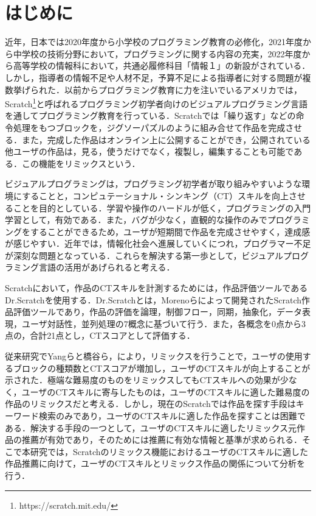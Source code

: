 \documentclass[11pt]{jreport}
\begin{document}
\newpage
{}	%



\chapter{はじめに}

近年，日本では2020年度から小学校のプログラミング教育の必修化，2021年度から中学校の技術分野において，プログラミングに関する内容の充実，2022年度から高等学校の情報科において，共通必履修科目「情報１」の新設がされている．\cite{monkashou}しかし，指導者の情報不足や人材不足，予算不足による指導者に対する問題が複数挙げられた．\cite{monkashou2}以前からプログラミング教育に力を注いでいるアメリカでは，Scratch\footnote{https://scratch.mit.edu/}\cite{resnick2009scratch}と呼ばれるプログラミング初学者向けのビジュアルプログラミング言語を通してプログラミング教育を行っている．Scratchでは「繰り返す」などの命令処理をもつブロックを，ジグソーパズルのように組み合せて作品を完成させる．また，完成した作品はオンライン上に公開することができ，公開されている他ユーザの作品は，見る，使うだけでなく，複製し，編集することも可能である．この機能をリミックスという．

ビジュアルプログラミングは，プログラミング初学者が取り組みやすいような環境にすることと，コンピュテーショナル・シンキング（CT）\cite{wing2006computational}スキルを向上させることを目的としている．学習や操作のハードルが低く，プログラミングの入門学習として，有効である．また，バグが少なく，直観的な操作のみでプログラミングをすることができるため，ユーザが短期間で作品を完成させやすく，達成感が感じやすい．近年では，情報化社会へ進展していくにつれ，プログラマー不足が深刻な問題となっている．これらを解決する第一歩として，ビジュアルプログラミング言語の活用があげられると考える．

Scratchにおいて，作品のCTスキルを計測するためには，作品評価ツールであるDr.Scratch\cite{moreno2015dr}を使用する．Dr.Scratchとは，Morenoらによって開発されたScratch作品評価ツールであり，作品の評価を論理，制御フロー，同期，抽象化，データ表現，ユーザ対話性，並列処理の7概念に基づいて行う．また，各概念を0点から3点の，合計21点とし，CTスコアとして評価する．

従来研究でYangら\cite{10.1145/2724660.2724674}と橋谷ら\cite{橋谷直樹2022scratch}，により，リミックスを行うことで，ユーザの使用するブロックの種類数とCTスコアが増加し，ユーザのCTスキルが向上することが示された．極端な難易度のものをリミックスしてもCTスキルへの効果が少なく，ユーザのCTスキルに寄与したものは，ユーザのCTスキルに適した難易度の作品のリミックスだと考える．しかし，現在のScratchでは作品を探す手段はキーワード検索のみであり，ユーザのCTスキルに適した作品を探すことは困難である．解決する手段の一つとして，ユーザのCTスキルに適したリミックス元作品の推薦が有効であり，そのためには推薦に有効な情報と基準が求められる．そこで本研究では，Scratchのリミックス機能におけるユーザのCTスキルに適した作品推薦に向けて，ユーザのCTスキルとリミックス作品の関係について分析を行う．
\end{document}
